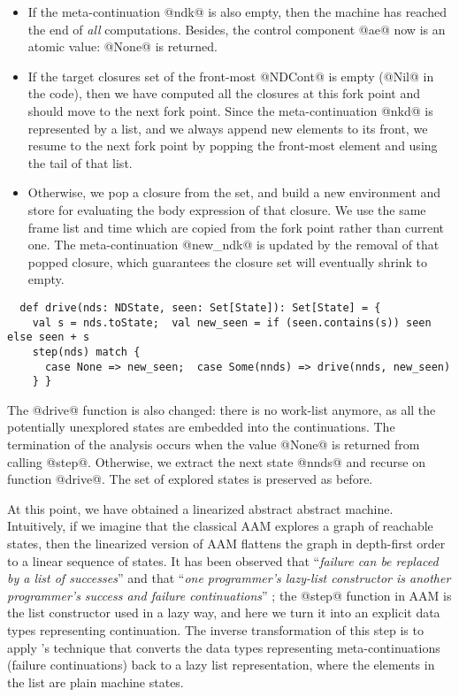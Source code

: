 \documentclass[acmsmall, screen]{acmart}\settopmatter{}
\begin{document}
\begin{itemize}
  \item If the meta-continuation @ndk@ is also empty, then the machine has reached the end of \textit{all}
    computations. Besides, the control component @ae@ now is an atomic value: @None@ is returned.
  \item If the target closures set of the front-most @NDCont@ is empty (@Nil@ in the code),
    then we have computed all the closures at this fork point and should move to the next fork
    point. Since the meta-continuation @nkd@ is represented by a list, and we always append new
    elements to its front, we resume to the next fork point by popping the front-most
    element and using the tail of that list.
  \item Otherwise, we pop a closure from the set, and build a new environment and store for
    evaluating the body expression of that closure. We use the same frame list and time which
    are copied from the fork point rather than current one.
    The meta-continuation @new_ndk@ is updated by the removal of that popped closure, which guarantees
    the closure set will eventually shrink to empty.
\end{itemize}

\begin{lstlisting}
  def drive(nds: NDState, seen: Set[State]): Set[State] = {
    val s = nds.toState;  val new_seen = if (seen.contains(s)) seen else seen + s
    step(nds) match {
      case None => new_seen;  case Some(nnds) => drive(nnds, new_seen)
    } }
\end{lstlisting}

The @drive@ function is also changed: there is no work-list anymore, as all the potentially
unexplored states are embedded into the continuations.
The termination of the analysis occurs when the value @None@ is returned from calling @step@.
Otherwise, we extract the next state @nnds@ and recurse on function @drive@.
The set of explored states is preserved as before.

At this point, we have obtained a linearized abstract abstract machine.
Intuitively, if we imagine that the classical AAM explores a graph of reachable states,
then the linearized version of AAM flattens the graph in depth-first order to a linear sequence of states.
It has been observed that ``\textit{failure can be replaced by a list of successes}''
\cite{10.1007/3-540-15975-4_33} and that ``\textit{one programmer’s lazy-list
constructor is another programmer’s success and failure continuations}'' \cite{danvy2006a};
the @step@ function in AAM is the list constructor used in a lazy way, and here we turn it
into an explicit data types representing continuation.
The inverse transformation of this step is to apply \citeauthor{10.1007/3-540-15975-4_33}'s
technique that converts the data types representing meta-continuations (failure continuations)
back to a lazy list representation, where the elements in the list are plain machine states.
\end{document}
